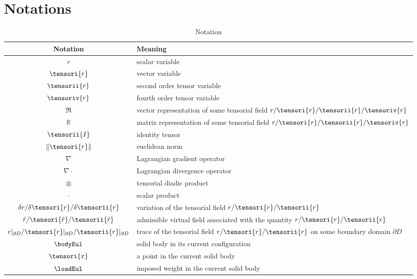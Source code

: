 \section*{Notations}
\label{sec_notations}
%
%
%
\begin{longtable}{c l}
    \caption{Notation}
    \label{table_notation}
    \\
    \hline
    \textbf{Notation} & \textbf{Meaning}
    \\
    \hline
    $r$ & scalar variable
    \\
    $\tensori{r}$ & vector variable
    \\
    $\tensorii{r}$ & second order tensor variable
    \\
    $\tensoriv{r}$ & fourth order tensor variable
    \\
    $\mathfrak{R}$ & vector representation of some tensorial field $r / \tensori{r} / \tensorii{r} / \tensoriv{r}$
    \\
    $\mathbb{R}$ & matrix representation of some tensorial field $r / \tensori{r} / \tensorii{r} / \tensoriv{r}$
    \\
    $\tensorii{I}$ & identity tensor
    \\
    $\lVert \tensori{r} \rVert$ & euclidean norm
    \\
    $\nabla$ & Lagrangian gradient operator
    \\
    $\nabla \cdot$ & Lagrangian divergence operator
    \\
    $\otimes$ & tensorial diadic product
    \\
    $\cdot$ & scalar product
    \\
    $\delta r / \delta \tensori{r} / \delta \tensorii{r}$ & variation of the tensorial field $r / \tensori{r} / \tensorii{r}$
    \\
    $\hat{r} / \tensori{\hat{r}} / \tensorii{\hat{r}}$ & admissible virtual field associated with the quantity $r / \tensori{r} / \tensorii{r}$
    \\
    $r \vert_{\partial D} / \tensori{r} \vert_{\partial D} / \tensorii{r} \vert_{\partial D}$ & trace of the tensorial field $r / \tensori{r} / \tensorii{r}$ on some boundary domain $\partial D$
    \\
    $\bodyEul$ & solid body in its current configuration
    \\
    $\tensori{x}$ & a point in the current solid body
    \\
    $\loadEul$ & imposed weight in the current solid body

\end{longtable}
